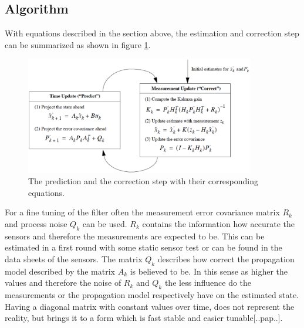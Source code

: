 \subsection*{Algorithm}
With equations described in the section above, the estimation and correction step can be summarized as shown in figure \ref{equation_kalman}.
\begin{figure}[h]
\begin{center}
\includegraphics[width=10cm]{pictures/equation_kalman.eps}
\caption{The prediction and the correction step with their corresponding equations. }
\label{equation_kalman}
\end{center}
\end{figure} 
For a fine tuning of the filter often the measurement error covariance matrix $R_k$ and process noise $Q_k$ can be used. $R_k$ contains the information how accurate the sensors and therefore the measurements are expected to be. This can be estimated in a first round with some static sensor test or can be found in the data sheets of the sensors. The matrix $Q_k$ describes how correct the propagation model described by the matrix $A_k$ is believed to be. In this sense as higher the values and therefore the noise of $R_k$ and $Q_k$ the less influence do the measurements or the propagation model respectively have on the estimated state. Having a diagonal matrix with constant values over time, does not represent the reality, but brings it to a form which is fast stable and easier tunable[..pap..]. 

